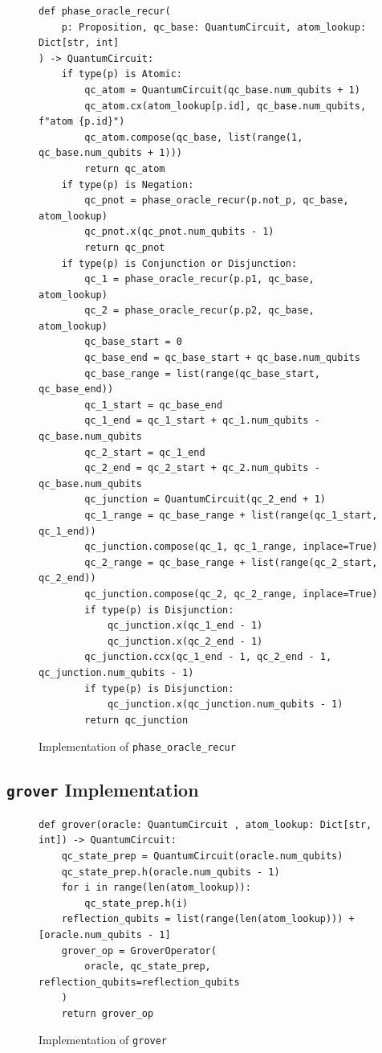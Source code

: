 \begin{figure}[H]
\centering
\begin{verbatim}
def phase_oracle_recur(
    p: Proposition, qc_base: QuantumCircuit, atom_lookup: Dict[str, int]
) -> QuantumCircuit:
    if type(p) is Atomic:
        qc_atom = QuantumCircuit(qc_base.num_qubits + 1)
        qc_atom.cx(atom_lookup[p.id], qc_base.num_qubits, f"atom {p.id}")
        qc_atom.compose(qc_base, list(range(1, qc_base.num_qubits + 1)))
        return qc_atom
    if type(p) is Negation:
        qc_pnot = phase_oracle_recur(p.not_p, qc_base, atom_lookup)
        qc_pnot.x(qc_pnot.num_qubits - 1)
        return qc_pnot
    if type(p) is Conjunction or Disjunction:
        qc_1 = phase_oracle_recur(p.p1, qc_base, atom_lookup)
        qc_2 = phase_oracle_recur(p.p2, qc_base, atom_lookup)
        qc_base_start = 0
        qc_base_end = qc_base_start + qc_base.num_qubits
        qc_base_range = list(range(qc_base_start, qc_base_end))
        qc_1_start = qc_base_end
        qc_1_end = qc_1_start + qc_1.num_qubits - qc_base.num_qubits
        qc_2_start = qc_1_end
        qc_2_end = qc_2_start + qc_2.num_qubits - qc_base.num_qubits
        qc_junction = QuantumCircuit(qc_2_end + 1)
        qc_1_range = qc_base_range + list(range(qc_1_start, qc_1_end))
        qc_junction.compose(qc_1, qc_1_range, inplace=True)
        qc_2_range = qc_base_range + list(range(qc_2_start, qc_2_end))
        qc_junction.compose(qc_2, qc_2_range, inplace=True)
        if type(p) is Disjunction:
            qc_junction.x(qc_1_end - 1)
            qc_junction.x(qc_2_end - 1)
        qc_junction.ccx(qc_1_end - 1, qc_2_end - 1, qc_junction.num_qubits - 1)
        if type(p) is Disjunction:
            qc_junction.x(qc_junction.num_qubits - 1)
        return qc_junction
\end{verbatim}
\caption{Implementation of \texttt{phase\_oracle\_recur} }
\label{fig:phase_oracle_recur}
\end{figure}

\subsection{\texttt{grover} Implementation}

\begin{figure}

\end{figure}

\begin{figure}
\centering
\begin{verbatim}
def grover(oracle: QuantumCircuit , atom_lookup: Dict[str, int]) -> QuantumCircuit:
    qc_state_prep = QuantumCircuit(oracle.num_qubits)
    qc_state_prep.h(oracle.num_qubits - 1)
    for i in range(len(atom_lookup)):
        qc_state_prep.h(i)
    reflection_qubits = list(range(len(atom_lookup))) + [oracle.num_qubits - 1]
    grover_op = GroverOperator(
        oracle, qc_state_prep, reflection_qubits=reflection_qubits
    )
    return grover_op
\end{verbatim}
\caption{Implementation of \texttt{grover} }
\label{fig:grover}
\end{figure}
